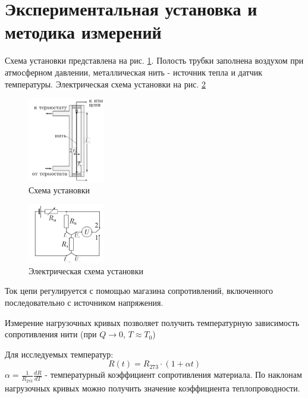 \documentclass[a4paper,12pt]{article} %
\begin{document}
\section{Экспериментальная установка и методика измерений}
Схема установки представлена на рис. \ref{схема}. Полость трубки заполнена воздухом при атмосферном давлении, металлическая нить - источник тепла и датчик температуры. Электрическая схема установки на рис. \ref{электричество}  
\begin{figure}[h!]
\begin{center}
\includegraphics[width=0.3\textwidth]{Схема}
\end{center}
\caption{Схема установки} \label{схема}
\end{figure}

\begin{figure}[h!]
\begin{center}
\includegraphics[width=0.3\textwidth]{Электричество}
\end{center}
\caption{Электрическая схема установки} \label{электричество}
\end{figure}
Ток цепи регулируется с помощью магазина сопротивлений, включенного последовательно с источником напряжения.

Измерение нагрузочных кривых позволяет получить температурную зависимость сопротивления нити (при $Q \to 0$, $T\approx T_0$)

Для исследуемых температур:
\begin{equation}
R(t)=R_{273}\cdot(1+\alpha t)
\end{equation}
$\alpha=\frac{1}{R_{273}}\frac{dR}{dT}$  - температурный коэффициент сопротивления материала. По наклонам нагрузочных кривых можно получить значение коэффициента теплопроводности.
\end{document}

